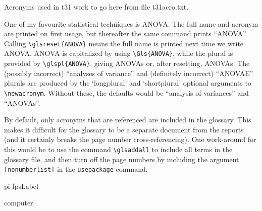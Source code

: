 Acronyms used in t31 work to go here from file t31acro.txt.

One of my favourite statistical techniques is \gls{ANOVA}.
The full name and acronym are printed on first usage, but thereafter the same command prints ``\gls{ANOVA}''.
Calling \verb+\glsreset{ANOVA}+ means the full name is printed next time we write \gls{ANOVA}.
\Gls{ANOVA} is capitalized by using \verb+\Gls{ANOVA}+, while the plural is provided by \verb+\glspl{ANOVA}+, giving \glspl{ANOVA} or, after resetting,
\glspl{ANOVA}.
The (possibly incorrect) ``analyses of variance'' and (definitely incorrect) ``ANOVAE'' plurals are produced by the `longplural' and `shortplural' optional arguments to \verb+\newacronym+.
Without these, the defaults would be ``analysis of variances'' and ``ANOVAs''.

By default, only acronyms that are referenced are included in the glossary.
This makes it difficult for the glossary to be a separate document from the reports (and it certainly breaks the page number cross-referencing).
One work-around for this would be to use the command \verb+\glsaddall+ to include all terms in the glossary file, and then turn off the page numbers by including the argument \verb+[nonumberlist]+ in the \verb+usepackage+ command.

\glsaddall



\printglossaries




\Gls{pi}
\Gls{fpsLabel}



\Gls{computer}
